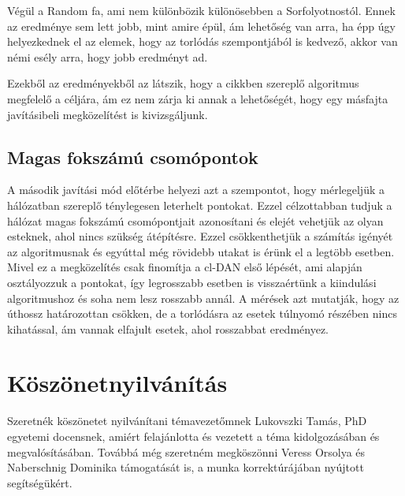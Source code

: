 \documentclass[12pt]{report}
\begin{document}
Végül a Random fa, ami nem különbözik különösebben a Sorfolyotnostól.
Ennek az eredménye sem lett jobb, mint amire épül, ám lehetőség van arra, ha épp úgy helyezkednek el az elemek, hogy az torlódás szempontjából is kedvező, akkor van némi esély arra, hogy jobb eredményt ad.

Ezekből az eredményekből az látszik, hogy a cikkben szereplő algoritmus megfelelő a céljára, ám ez nem zárja ki annak a lehetőségét, hogy egy másfajta javításibeli megközelítést is kivizsgáljunk. 


\section{Magas fokszámú csomópontok}

A második javítási mód előtérbe helyezi azt a szempontot, hogy mérlegeljük a hálózatban szereplő ténylegesen leterhelt pontokat.
Ezzel célzottabban tudjuk a hálózat magas fokszámú csomópontjait azonosítani és elejét vehetjük az olyan esteknek, ahol nincs szükség átépítésre.
Ezzel csökkenthetjük a számítás igényét az algoritmusnak és egyúttal még rövidebb utakat is érünk el a legtöbb esetben.
Mivel ez a megközelítés csak finomítja a cl-DAN első lépését, ami alapján osztályozzuk a pontokat, így legrosszabb esetben is visszaértünk a kiindulási algoritmushoz és soha nem lesz rosszabb annál.
A mérések azt mutatják, hogy az úthossz határozottan csökken, de a torlódásra az esetek túlnyomó részében nincs kihatással, ám vannak elfajult esetek, ahol rosszabbat eredményez.


\chapter{Köszönetnyilvánítás}

Szeretnék köszönetet nyilvánítani témavezetőmnek Lukovszki Tamás, PhD egyetemi docensnek, amiért felajánlotta és vezetett a téma kidolgozásában és megvalósításában.
Továbbá még szeretném megköszönni Veress Orsolya és Naberschnig Dominika támogatását is, a munka korrektúrájában nyújtott segítségükért.  





	
\end{document}
